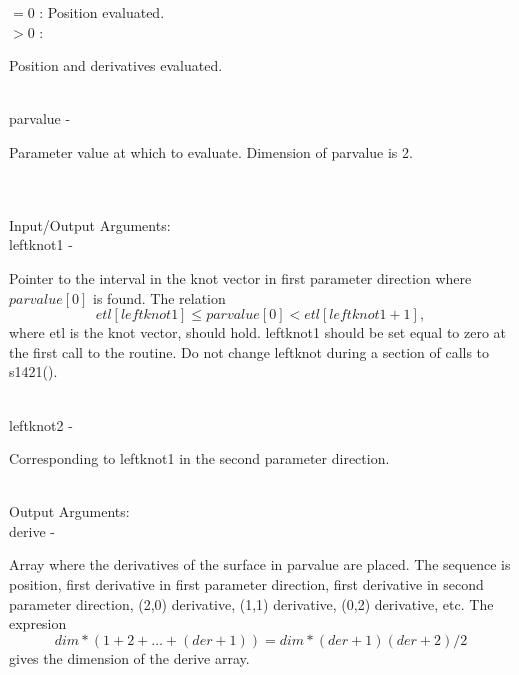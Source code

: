                 \>\>\>\>\>      $= 0$ \> : Position evaluated.\\
                \>\>\>\>\>      $> 0$ \> : \begin{minipg5}
                                              Position and derivatives
                                              evaluated.
                                            \end{minipg5}\\
        \>\>    {\fov parvalue}\> - \>          \begin{minipg2}
                                Parameter value at which to evaluate. Dimension
                                of parvalue is 2.
                                \end{minipg2}\\[0.3ex]
\\
        \>Input/Output Arguments:\\
        \>\>    {\fov leftknot1}\> - \>
                \begin{minipg2}
                  Pointer to the interval in the knot
                  vector in first
                  parameter direction where $parvalue[0]$ is
                  found. The relation
                  \[
                  etl[leftknot1]\leq parvalue[0]<etl[leftknot1+1],
                  \]
                  where {\fov etl} is the knot
                  vector, should hold. {\fov leftknot1} should be set
                  equal to zero at the first call to the routine. Do not
                  change {\fov leftknot} during a section of calls to
                  s1421().
                \end{minipg2} \\[0.8ex]
        \>\>    {\fov leftknot2}\> - \> \begin{minipg2}
                                Corresponding to {\fov leftknot1}
                                in the second parameter
                                direction.
                                \end{minipg2}\\[0.8ex]
\newpagetabs
        \>Output Arguments:\\
        \>\>    {\fov derive}\> - \>    \begin{minipg2}
                                Array where the derivatives of the surface in parvalue are
                                placed. The sequence is position, first derivative in
                                first parameter direction, first derivative in second
                                parameter direction, (2,0) derivative, (1,1)
                                derivative, (0,2) derivative, etc. The expresion
                                \[
                                dim*(1+2+\ldots+(der+1))=dim*(der+1)(der+2)/2
                                \]
                                gives the dimension of the {\fov derive} array.
                                \end{minipg2}\\[0.8ex]
